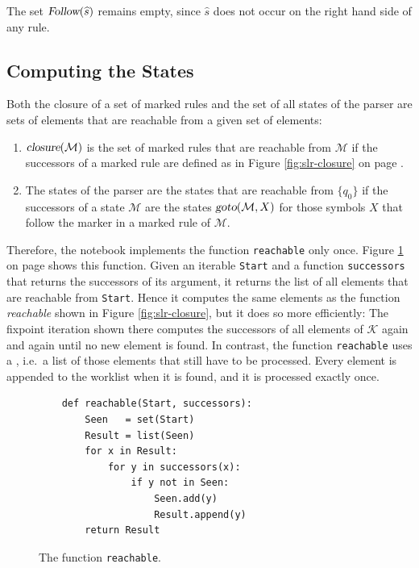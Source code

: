 The set $\textsl{Follow}(\widehat{s})$ remains empty, since $\widehat{s}$ does not occur on the right hand side of
any rule.

\subsection{Computing the States}
Both the closure of a set of marked rules and the set of all states of the parser are sets of elements that are
reachable from a given set of elements:
\begin{enumerate}
\item $\textsl{closure}(\mathcal{M})$ is the set of marked rules that are reachable from $\mathcal{M}$ if the
      successors of a marked rule are defined as in Figure \ref{fig:slr-closure} on page
      \pageref{fig:slr-closure}.
\item The states of the parser are the states that are reachable from $\{ q_0 \}$ if the successors of a state
      $\mathcal{M}$ are the states $\textsl{goto}(\mathcal{M}, X)$ for those symbols $X$ that follow the marker in a
      marked rule of $\mathcal{M}$.
\end{enumerate}
Therefore, the notebook implements the function \texttt{reachable} only once.  Figure
\ref{fig:04-SLR-Table-Generator.ipynb:reachable} on page \pageref{fig:04-SLR-Table-Generator.ipynb:reachable} shows
this function.  Given an iterable \texttt{Start} and a function \texttt{successors} that returns the successors of
its argument, it returns the list of all elements that are reachable from \texttt{Start}.  Hence it computes the same
elements as the function \textsl{reachable} shown in Figure \ref{fig:slr-closure}, but it does so more efficiently:
The fixpoint iteration shown there computes the successors of all elements of $\mathcal{K}$ again and again until no
new element is found.  In contrast, the function \texttt{reachable} uses a , i.e.~a
list of those elements that still have to be processed.  Every element is appended to the worklist when it is found,
and it is processed exactly once.

\begin{figure}[!ht]
\centering
\begin{verbatim}
    def reachable(Start, successors):
        Seen   = set(Start)
        Result = list(Seen)
        for x in Result:
            for y in successors(x):
                if y not in Seen:
                    Seen.add(y)
                    Result.append(y)
        return Result
\end{verbatim}
\vspace*{-0.3cm}
\caption{The function \texttt{reachable}.}
\label{fig:04-SLR-Table-Generator.ipynb:reachable}
\end{figure}

